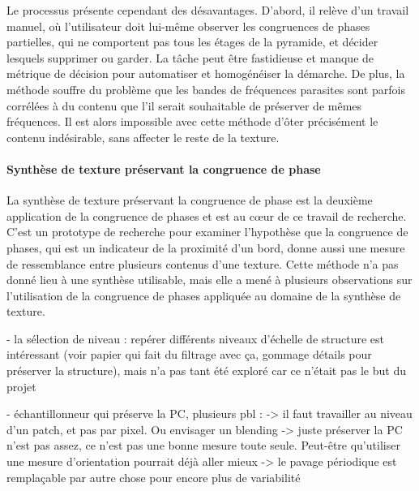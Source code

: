 Le processus présente cependant des désavantages. D'abord, il relève d'un travail manuel, où l'utilisateur doit lui-même observer les congruences de phases partielles, qui ne comportent pas tous les étages de la pyramide, et décider lesquels supprimer ou garder. La tâche peut être fastidieuse et manque de métrique de décision pour automatiser et homogénéiser la démarche. De plus, la méthode souffre du problème que les bandes de fréquences \og parasites \fg sont parfois corrélées à du contenu que l'il serait souhaitable de préserver de mêmes fréquences. Il est alors impossible avec cette méthode d'ôter précisément le contenu indésirable, sans affecter le reste de la texture.

\paragraph{Synthèse de texture préservant la congruence de phase}

La synthèse de texture préservant la congruence de phase est la deuxième application de la congruence de phases et est au cœur de ce travail de recherche. C'est un prototype de recherche pour examiner l'hypothèse que la congruence de phases, qui est un indicateur de la proximité d'un bord, donne aussi une mesure de ressemblance entre plusieurs contenus d'une texture. Cette méthode n'a pas donné lieu à une synthèse utilisable, mais elle a mené à plusieurs observations sur l'utilisation de la congruence de phases appliquée au domaine de la synthèse de texture.


- la sélection de niveau : repérer différents niveaux d'échelle de structure est intéressant (voir papier qui fait du filtrage avec ça, gommage détails pour préserver la structure), mais n'a pas tant été exploré car ce n'était pas le but du projet

- échantillonneur qui préserve la PC, plusieurs pbl :
    -> il faut travailler au niveau d'un patch, et pas par pixel. Ou envisager un blending
    -> juste préserver la PC n'est pas assez, ce n'est pas une bonne mesure toute seule. Peut-être qu'utiliser une mesure d'orientation pourrait déjà aller mieux
    -> le pavage périodique est remplaçable par autre chose pour encore plus de variabilité